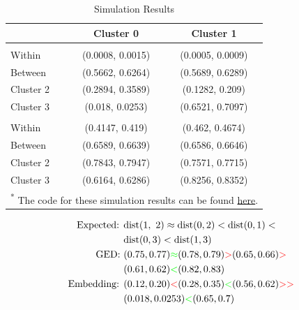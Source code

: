 \documentclass[
  11pt,
  letterpaper,
]{article}
\begin{document}
\begin{longtable}[t]{lcc}
\caption{Simulation Results} \label{tab-sim}\\
\toprule
  & Cluster 0 & Cluster 1\\
\midrule
\addlinespace[0.3em]
\multicolumn{3}{l}{\textbf{Embeddings}}\\
\hspace{1em}Within & (0.0008, 0.0015) & (0.0005, 0.0009)\\
\hspace{1em}Between & (0.5662, 0.6264) & (0.5689, 0.6289)\\
\hspace{1em}Cluster 2 & (0.2894, 0.3589) & (0.1282, 0.209)\\
\hspace{1em}Cluster 3 & (0.018, 0.0253) & (0.6521, 0.7097)\\
\addlinespace[0.3em]
\multicolumn{3}{l}{\textbf{GED}}\\
\hspace{1em}Within & (0.4147, 0.419) & (0.462, 0.4674)\\
\hspace{1em}Between & (0.6589, 0.6639) & (0.6586, 0.6646)\\
\hspace{1em}Cluster 2 & (0.7843, 0.7947) & (0.7571, 0.7715)\\
\hspace{1em}Cluster 3 & (0.6164, 0.6286) & (0.8256, 0.8352)\\
\bottomrule
\multicolumn{3}{l}{\rule{0pt}{1em}\textsuperscript{*} The code for these simulation results can be found \href{https://github.com/Tiny-Quant/GNN-EGG/blob/pre-release/notebooks/CS-8321-Final-Paper-Code.ipynb}{here}.}\\
\end{longtable}

\begin{equation} \label{eq-sim}
    \begin{split}
        \text{Expected: } &\text{dist}(1,\ 2) \approx \text{dist}(0, 2) < \text{dist}(0, 1) < \\ 
        &\text{dist}(0, 3) < \text{dist}(1, 3) \\ 
        \text{GED: }&(0.75, 0.77) \textcolor{green}{\approx} (0.78, 0.79) 
                    \textcolor{red}{>} (0.65, 0.66) \textcolor{red}{>} \\
                    &(0.61, 0.62) \textcolor{green}{<} (0.82, 0.83) \\
        \text{Embedding: }&(0.12, 0.20) \textcolor{red}{<} (0.28, 0.35) 
                    \textcolor{green}{<} (0.56, 0.62) \textcolor{red}{>>} \\
                    &(0.018, 0.0253) \textcolor{green}{<} (0.65, 0.7)
        \end{split}
\end{equation}
\end{document}

